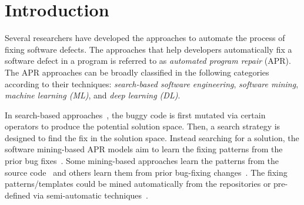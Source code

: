 \section{Introduction}


Several researchers have developed the approaches to automate the
process of fixing software defects. The approaches that help
developers automatically fix a software defect in a program is
referred to as {\em automated program repair} (APR). The APR
approaches can be broadly classified in the following categories
according to their techniques:
{\em search-based software engineering}, {\em software mining}, {\em
  machine learning (ML)}, and {\em deep learning (DL)}.

In search-based
approaches~\cite{LeGoues-icse12,le2011genprog,martinez2016astor,qi2014strength},
the buggy code is first mutated via certain operators to produce the
potential solution space. Then, a search strategy is designed to find
the fix in the solution space. Instead searching for a solution, the
software mining-based APR models aim to learn the fixing patterns from
the prior bug
fixes~\cite{kim2013automatic,le2016history,liu2019avatar,tbar-issta19,nguyen2013semfix,
  icse10,ray-fse12}. Some mining-based approaches learn the patterns
from the source code~\cite{liu2019avatar,tbar-issta19} and others
learn them from prior bug-fixing
changes~\cite{wen2018context,Simfix,koyuncu2018fixminer}.  The fixing
patterns/templates could be mined automatically from the repositories
or pre-defined via semi-automatic
techniques~\cite{le2016history,nguyen2013semfix,liu2019avatar,tbar-issta19}.

